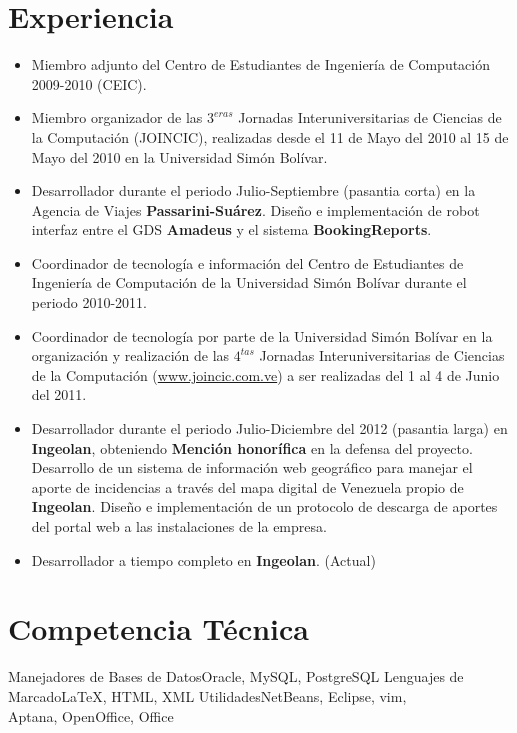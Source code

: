\documentclass[10pt,a4paper]{moderncv}
\begin{document}
\section{Experiencia}
	\begin{itemize}
	   \item Miembro adjunto del Centro de Estudiantes de Ingenier\'ia de 
             Computaci\'on 2009-2010 (CEIC).
	   \item Miembro organizador de las $3^{eras}$ Jornadas Interuniversitarias 
             de Ciencias de la Computaci\'on (JOINCIC), realizadas desde el 11 
             de Mayo del 2010 al 15 de Mayo del 2010 en la Universidad Sim\'on 
             Bol\'ivar. 
       \item Desarrollador durante el periodo Julio-Septiembre (pasantia 
             corta) en la Agencia de Viajes \textbf{Passarini-Su\'arez}. 
             Dise\~no e implementaci\'on de robot interfaz entre el GDS 
             \textbf{Amadeus} y el sistema \textbf{BookingReports}.
       \item Coordinador de tecnolog\'ia e informaci\'on del Centro de 
             Estudiantes de Ingenier\'ia de Computaci\'on de la Universidad 
             Sim\'on Bol\'ivar durante el periodo 2010-2011.
       \item Coordinador de tecnolog\'ia por parte de la Universidad Sim\'on 
             Bol\'ivar en la organizaci\'on y realizaci\'on de las $4^{tas}$ 
             Jornadas Interuniversitarias de Ciencias de la Computaci\'on 
             (\url{www.joincic.com.ve}) a ser realizadas del 1 al 4 de Junio 
             del 2011.
       \item Desarrollador durante el periodo Julio-Diciembre del 2012 
            (pasantia larga) en \textbf{Ingeolan}, obteniendo 
            \textbf{Menci\'on honor\'ifica} en la defensa del proyecto. 
            Desarrollo de un sistema de informaci\'on web geogr\'afico para 
            manejar el aporte de incidencias a trav\'es del mapa digital de 
            Venezuela propio de \textbf{Ingeolan}. Dise\~no e implementaci\'on 
            de un protocolo de descarga de aportes del portal web a las 
            instalaciones de la empresa.
       \item Desarrollador a tiempo completo en \textbf{Ingeolan}. (Actual)
    \end{itemize}

\section{Competencia T\'ecnica}
				{Manejadores de Bases de Datos}{Oracle, MySQL, PostgreSQL}
				{Lenguajes de Marcado}{LaTeX, HTML, XML}
				{Utilidades}{NetBeans, Eclipse, vim, \\ Aptana, OpenOffice, Office}	
\end{document}
